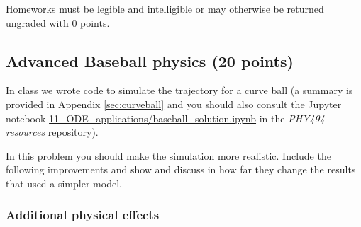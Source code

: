 \documentclass[letterpaper]{scrartcl}
\begin{document}
Homeworks must be legible and intelligible or may otherwise be
returned ungraded with 0 points.




\subsection{Advanced Baseball physics (20 points)}
\label{sec:advanced}

In class we wrote code to simulate the trajectory for a curve ball (a
summary is provided in Appendix \ref{sec:curveball} and you should
also consult the Jupyter notebook
\href{https://github.com/ASU-CompMethodsPhysics-PHY494/PHY494-resources/blob/master/11_ODE_applications/baseball_solution.ipynb}{11\_ODE\_applications/baseball\_solution.ipynb}
in the \emph{PHY494-resources} repository).

In this problem you should make the simulation more realistic. Include
the following improvements and show and discuss in how far they change
the results that used a simpler model.

\subsubsection{Additional physical effects}
\label{sec:add}
\end{document}

